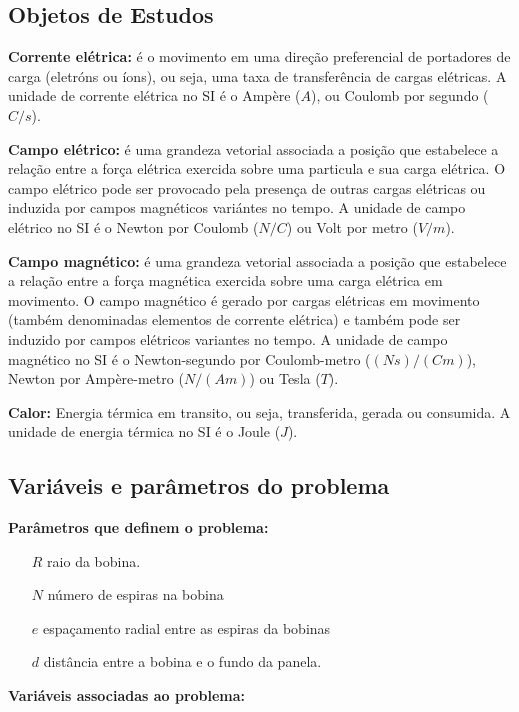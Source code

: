 \documentclass[
	article,			%
	11pt,				%
	oneside,			%
	a4paper,			%
	english,			%
	brazil,				%
	sumario=tradicional
	]{abntex2}
\begin{document}
\subsection{Objetos de Estudos}

\textbf{Corrente elétrica:} é o movimento em uma direção preferencial de portadores de carga (eletróns ou íons), ou seja, uma taxa de transferência de cargas elétricas. A unidade de corrente elétrica no SI é o Ampère ($ A $), ou Coulomb por segundo ($ C/s $). \cite{keller:1998}

\textbf{Campo elétrico:} é uma grandeza vetorial associada a posição que estabelece a relação entre a força elétrica exercida sobre uma particula e sua carga elétrica. O campo elétrico pode ser provocado pela presença de outras cargas elétricas ou induzida por campos magnéticos variántes no tempo. A unidade de campo elétrico no SI é o Newton por Coulomb ($ N/C $) ou Volt por metro ($ V/m $). \cite{keller:1998}

\textbf{Campo magnético:} é uma grandeza vetorial associada a posição que estabelece a relação entre a força magnética exercida sobre uma carga elétrica em movimento. O campo magnético é gerado por cargas elétricas em movimento (também denominadas elementos de corrente elétrica) e também pode ser induzido por campos elétricos variantes no tempo. A unidade de campo magnético no SI é o Newton-segundo por Coulomb-metro ($ (Ns)/(Cm) $), Newton por Ampère-metro ($ N/(Am) $) ou Tesla ($ T $). \cite{keller:1998}

\textbf{Calor:} Energia térmica em transito, ou seja, transferida, gerada ou consumida. A unidade de energia térmica no SI é o Joule ($ J $).

\subsection{Variáveis e parâmetros do problema}

\textbf{Parâmetros que definem o problema:}

\begin{itemize}
	\item[$ R $] raio da bobina.
	\item[$ N $] número de espiras na bobina
	\item[$ e $] espaçamento radial entre as espiras da bobinas
	\item[$ d $] distância entre a bobina e o fundo da panela.
\end{itemize}

\textbf{Variáveis associadas ao problema:}
\end{document}

